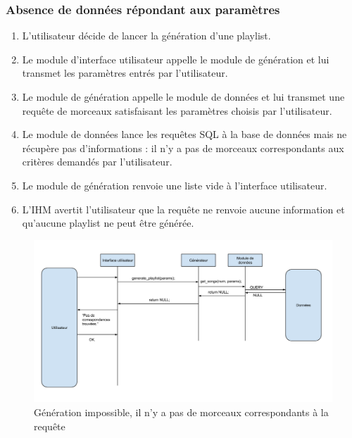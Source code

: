 \subsubsection{Absence de données répondant aux paramètres}

\begin{enumerate}
\item L'utilisateur décide de lancer la génération d'une playlist.
\item Le module d'interface utilisateur appelle le module de génération et 
lui transmet les paramètres entrés par l'utilisateur.
\item Le module de génération appelle le module de données et lui transmet 
une requête de morceaux satisfaisant les paramètres choisis par l'utilisateur.
\item Le module de données lance les requêtes SQL à la base de données mais 
ne récupère pas d'informations : il n'y a pas de morceaux correspondants aux 
critères demandés par l'utilisateur.
\item Le module de génération renvoie une liste vide à l'interface 
utilisateur.
\item L'IHM avertit l'utilisateur que la requête ne renvoie aucune 
information et qu'aucune playlist ne peut être générée.
\end{enumerate}

\begin{figure}[!h]
\includegraphics[width=14cm]{data/generation_nulle.png}
\caption{Génération impossible, il n'y a pas de morceaux correspondants à la requête}
\end{figure}